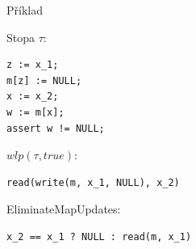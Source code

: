 \documentclass[11pt]{beamer}
\begin{document}
\begin{frame}[fragile]{Příklad}

Stopa $\tau$:
\begin{lstlisting}
z := x_1;
m[z] := NULL;
x := x_2;
w := m[x];
assert w != NULL;
\end{lstlisting}

\pause

$wlp(\tau, true)$:
\begin{lstlisting}
read(write(m, x_1, NULL), x_2)
\end{lstlisting}

\pause 

EliminateMapUpdates:
\begin{lstlisting}
x_2 == x_1 ? NULL : read(m, x_1)
\end{lstlisting}

\end{frame}
\end{document}
